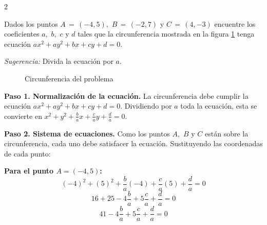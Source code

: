 \begin{prob}

\begin{multicols}{2}

Dados los puntos  $A\, = \,\left(-4, 5 \right),$ $B\, = \,\left(-2, 7 \right)$ y $C\, = \,\left(4, -3 \right)$ encuentre los coeficientes $a,$ $b,$ $c$ y $d$ tales que la circunferencia mostrada en la figura \ref{circunferenciainterpolacion} tenga ecuación $ax^2+ay^2+bx+cy+d=0.$ 

\textit{Sugerencia:} Divida la ecuación por $a.$

\columnbreak

\begin{figure}[H]
\caption{Circunferencia del problema}\label{circunferenciainterpolacion}
\end{figure}

\end{multicols}

\begin{myproof}
\textbf{Paso 1. Normalización de la ecuación.} La circunferencia debe cumplir la ecuación $ax^2+ay^2+bx+cy+d=0.$ Dividiendo por $a$ toda la ecuación, esta se convierte en $x^2+y^2+\frac{b}{a}x+\frac{c}{a}y+\frac{d}{a}=0.$

\textbf{Paso 2. Sistema de ecuaciones.} Como los puntos $A,$ $B$ y $C$ están sobre la circunferencia, cada uno debe satisfacer la ecuación. Sustituyendo las coordenadas de cada punto:

\textbf{Para el punto $A = (-4, 5)$:}
$$(-4)^2 + (5)^2 + \frac{b}{a}(-4) + \frac{c}{a}(5) + \frac{d}{a} = 0$$
$$16 + 25 - 4\frac{b}{a} + 5\frac{c}{a} + \frac{d}{a} = 0$$
$$41 - 4\frac{b}{a} + 5\frac{c}{a} + \frac{d}{a} = 0$$


\end{myproof}
\end{prob}
